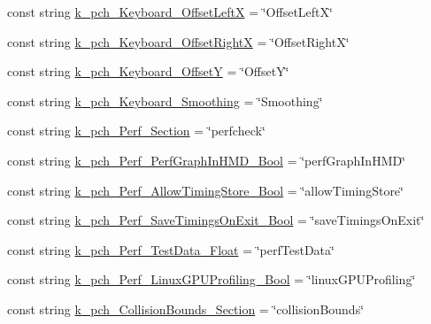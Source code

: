 \begin{DoxyCompactItemize}
\item 
const string \mbox{\hyperlink{class_valve_1_1_v_r_1_1_open_v_r_a0ca5c403a504e7107ed6ea9e78434659}{k\+\_\+pch\+\_\+\+Keyboard\+\_\+\+Offset\+LeftX}} = \char`\"{}Offset\+LeftX\char`\"{}
\item 
const string \mbox{\hyperlink{class_valve_1_1_v_r_1_1_open_v_r_a6d41a7506099e0a20d4c1285e031933d}{k\+\_\+pch\+\_\+\+Keyboard\+\_\+\+Offset\+RightX}} = \char`\"{}Offset\+RightX\char`\"{}
\item 
const string \mbox{\hyperlink{class_valve_1_1_v_r_1_1_open_v_r_a99ac366432e6d5b7b5099f7fea818dff}{k\+\_\+pch\+\_\+\+Keyboard\+\_\+\+OffsetY}} = \char`\"{}OffsetY\char`\"{}
\item 
const string \mbox{\hyperlink{class_valve_1_1_v_r_1_1_open_v_r_a5c7f4895ad7a00741428fd5256395b74}{k\+\_\+pch\+\_\+\+Keyboard\+\_\+\+Smoothing}} = \char`\"{}Smoothing\char`\"{}
\item 
const string \mbox{\hyperlink{class_valve_1_1_v_r_1_1_open_v_r_a95a7493ef8fe3992b26549d75fd71d68}{k\+\_\+pch\+\_\+\+Perf\+\_\+\+Section}} = \char`\"{}perfcheck\char`\"{}
\item 
const string \mbox{\hyperlink{class_valve_1_1_v_r_1_1_open_v_r_a15057afd3dac3ce34bcd79cdd172b750}{k\+\_\+pch\+\_\+\+Perf\+\_\+\+Perf\+Graph\+In\+H\+M\+D\+\_\+\+Bool}} = \char`\"{}perf\+Graph\+In\+H\+MD\char`\"{}
\item 
const string \mbox{\hyperlink{class_valve_1_1_v_r_1_1_open_v_r_aa1870293c05f2b5a5b8e8710a9c43399}{k\+\_\+pch\+\_\+\+Perf\+\_\+\+Allow\+Timing\+Store\+\_\+\+Bool}} = \char`\"{}allow\+Timing\+Store\char`\"{}
\item 
const string \mbox{\hyperlink{class_valve_1_1_v_r_1_1_open_v_r_acecfc43c8058e5546fc0b386d9e219af}{k\+\_\+pch\+\_\+\+Perf\+\_\+\+Save\+Timings\+On\+Exit\+\_\+\+Bool}} = \char`\"{}save\+Timings\+On\+Exit\char`\"{}
\item 
const string \mbox{\hyperlink{class_valve_1_1_v_r_1_1_open_v_r_a3dd8a2e7ba9f3d96784b67dc61789afa}{k\+\_\+pch\+\_\+\+Perf\+\_\+\+Test\+Data\+\_\+\+Float}} = \char`\"{}perf\+Test\+Data\char`\"{}
\item 
const string \mbox{\hyperlink{class_valve_1_1_v_r_1_1_open_v_r_a6af601e5bfa8579892b7101905cfcf5c}{k\+\_\+pch\+\_\+\+Perf\+\_\+\+Linux\+G\+P\+U\+Profiling\+\_\+\+Bool}} = \char`\"{}linux\+G\+P\+U\+Profiling\char`\"{}
\item 
const string \mbox{\hyperlink{class_valve_1_1_v_r_1_1_open_v_r_a65a17cf92e276bf7b29f8b2fcefca6d0}{k\+\_\+pch\+\_\+\+Collision\+Bounds\+\_\+\+Section}} = \char`\"{}collision\+Bounds\char`\"{}

\end{DoxyCompactItemize}
